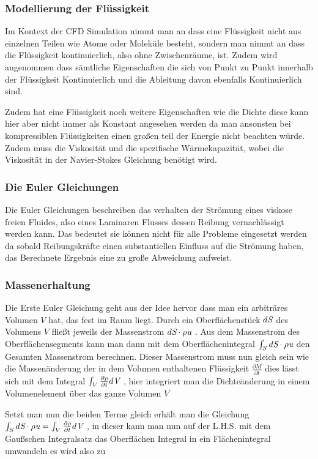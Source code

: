 \subsubsection{Modellierung der Flüssigkeit}
Im Kontext der CFD Simulation nimmt man an dass eine Flüssigkeit nicht aus einzelnen Teilen wie Atome oder Moleküle besteht, sondern man nimmt an dass die Flüssigkeit kontinuierlich, also ohne Zwischenräume, ist. Zudem wird angenommen dass sämtliche Eigenschaften die sich von Punkt zu Punkt innerhalb der Flüssigkeit Kontinuierlich und die Ableitung davon ebenfalls Kontinuierlich sind. 

Zudem hat eine Flüssigkeit noch weitere Eigenschaften wie die Dichte diese kann hier aber nicht immer als Konstant angesehen werden da man ansonsten bei kompressiblen Flüssigkeiten einen großen teil der Energie nicht beachten würde. Zudem muss die Viskosität und die spezifische Wärmekapazität, wobei die Viskosität in der Navier-Stokes Gleichung benötigt wird.

\subsubsection{Die Euler Gleichungen}
Die Euler Gleichungen beschreiben das verhalten der Strömung eines viskose freien Fluides, also eines Laminaren Flusses dessen Reibung vernachlässigt werden kann.  Das bedeutet sie können nicht für alle Probleme eingesetzt werden da sobald Reibungskräfte einen substantiellen Einfluss auf die Strömung haben, das Berechnete Ergebnis eine zu große Abweichung aufweist.

\subsubsection{Massenerhaltung}
Die Erste Euler Gleichung geht aus der Idee hervor dass man ein arbiträres Volumen $V$ hat, das fest im Raum liegt. Durch ein Oberflächenstück 
$d\emph{S}$ 
des Volumens 
$V$
 fließt jeweils der Massenstrom 
$d\emph{S}\cdot\rho\emph{u}$ . 
Aus dem Massenstrom des Oberflächensegments kann man dann mit dem Oberflächenintegral 
$\int_{S}d\emph{S}\cdot\rho\emph{u}$ 
den Gesamten Massenstrom berechnen. Dieser Massenstrom muss nun gleich sein wie die Massenänderung der in dem Volumen enthaltenen Flüssigkeit 
$\frac{\partial M}{\partial t}$ 
dies lässt sich mit dem Integral 
$\int_{V}\frac{\partial \rho}{\partial t} d\emph{V}$ 
, hier integriert man die Dichteänderung in einem Volumenelement über das ganze Volumen 
$V$ 

Setzt man nun die beiden Terme gleich erhält man die Gleichung 
$\int_{S}d\emph{S}\cdot\rho\emph{u} = \int_{V}\frac{\partial \rho}{\partial t} d\emph{V}$
, in dieser kann man nun auf der L.H.S. mit dem Gaußschen Integralsatz das Oberflächen Integral in ein Flächenintegral umwandeln es wird also zu
$$